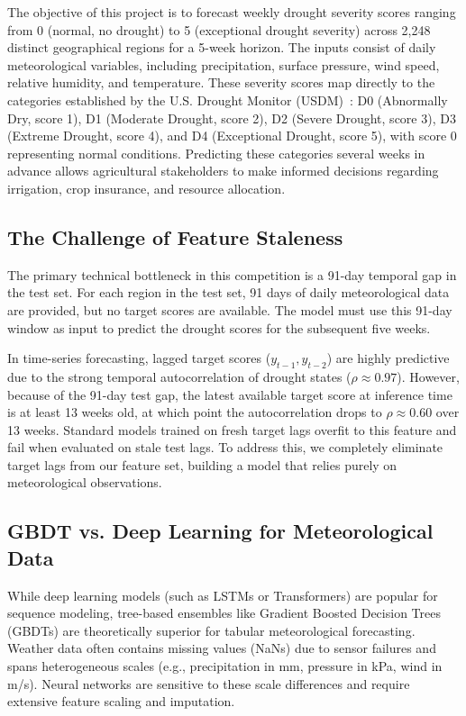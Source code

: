 \documentclass[conference]{IEEEtran}
\begin{document}
The objective of this project is to forecast weekly drought severity scores ranging from 0 (normal, no drought) to 5 (exceptional drought severity) across 2,248 distinct geographical regions for a 5-week horizon. The inputs consist of daily meteorological variables, including precipitation, surface pressure, wind speed, relative humidity, and temperature. These severity scores map directly to the categories established by the U.S. Drought Monitor (USDM)~\cite{svoboda2002us}: D0 (Abnormally Dry, score 1), D1 (Moderate Drought, score 2), D2 (Severe Drought, score 3), D3 (Extreme Drought, score 4), and D4 (Exceptional Drought, score 5), with score 0 representing normal conditions. Predicting these categories several weeks in advance allows agricultural stakeholders to make informed decisions regarding irrigation, crop insurance, and resource allocation.

\subsection{The Challenge of Feature Staleness}
The primary technical bottleneck in this competition is a 91-day temporal gap in the test set. For each region in the test set, 91 days of daily meteorological data are provided, but no target scores are available. The model must use this 91-day window as input to predict the drought scores for the subsequent five weeks. 

In time-series forecasting, lagged target scores ($y_{t-1}, y_{t-2}$) are highly predictive due to the strong temporal autocorrelation of drought states ($\rho \approx 0.97$). However, because of the 91-day test gap, the latest available target score at inference time is at least 13 weeks old, at which point the autocorrelation drops to $\rho \approx 0.60$ over 13 weeks. Standard models trained on fresh target lags overfit to this feature and fail when evaluated on stale test lags. To address this, we completely eliminate target lags from our feature set, building a model that relies purely on meteorological observations.

\subsection{GBDT vs. Deep Learning for Meteorological Data}
While deep learning models (such as LSTMs or Transformers) are popular for sequence modeling, tree-based ensembles like Gradient Boosted Decision Trees (GBDTs) are theoretically superior for tabular meteorological forecasting. Weather data often contains missing values (NaNs) due to sensor failures and spans heterogeneous scales (e.g., precipitation in mm, pressure in kPa, wind in m/s). Neural networks are sensitive to these scale differences and require extensive feature scaling and imputation. 
\end{document}
